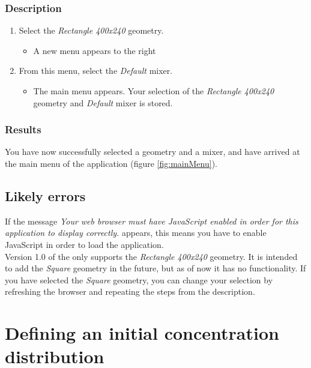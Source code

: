\subsubsection{Description}

\begin{enumerate}
\item Select the \emph{Rectangle 400x240} geometry.
\begin{itemize}
  \item A new menu appears to the right
\end{itemize}
\item From this menu, select the \emph{Default} mixer.
\begin{itemize}
  \item The main menu appears. Your selection of the \emph{Rectangle 400x240} geometry and \emph{Default} mixer is stored.
\end{itemize}
\end{enumerate}

\subsubsection{Results}
You have now successfully selected a geometry and a mixer, and have arrived at the main menu of the application (figure \ref{fig:mainMenu}).


\subsection{Likely errors}
If the message \emph{Your web browser must have JavaScript enabled in order for this application to display correctly.} appears, this means you have to enable JavaScript in order to load the application.\\

\noindent Version 1.0 of the \applicationname{} only supports the \emph{Rectangle 400x240} geometry. It is intended to add the \emph{Square} geometry in the future, but as of now it has no functionality. If you have selected the \emph{Square} geometry, you can change your selection by refreshing the browser and repeating the steps from the description.


\section{Defining an initial concentration distribution}
\label{sec:defineDist}


